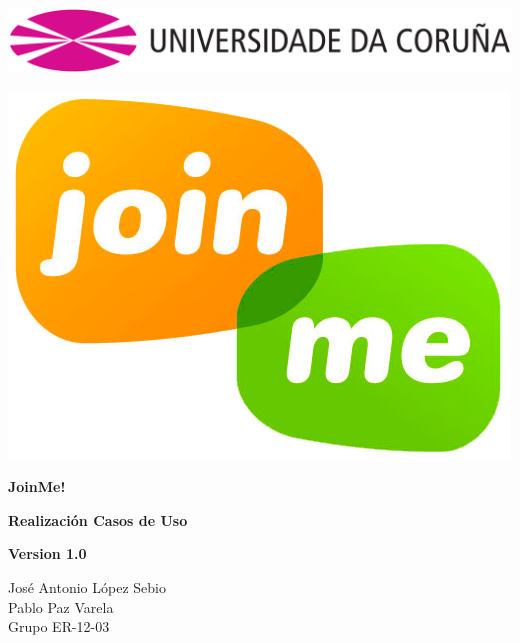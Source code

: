 \documentclass[12pt, a4paper, titlepage]{article}
\begin{document}

\begin{titlepage}

\includegraphics[width=15cm]{Imagenes/Simbolo_logo_UDC.png}

\vspace{3cm}

\begin{center}
\includegraphics[scale=0.3]{Imagenes/1a_Practica_ER_14-15.png}
\end{center}


\begin{flushright}
	
	\LARGE{\textbf{ JoinMe!}}
	
	\LARGE{\textbf{Realización Casos de Uso}}
	
	\large{\textbf{Version 1.0}}
	
\end{flushright}

\vspace{1cm}
\begin{center}
José Antonio López Sebio\\
Pablo Paz Varela\\
Grupo ER-12-03\\
\end{center}


\end{titlepage}
\end{document}
